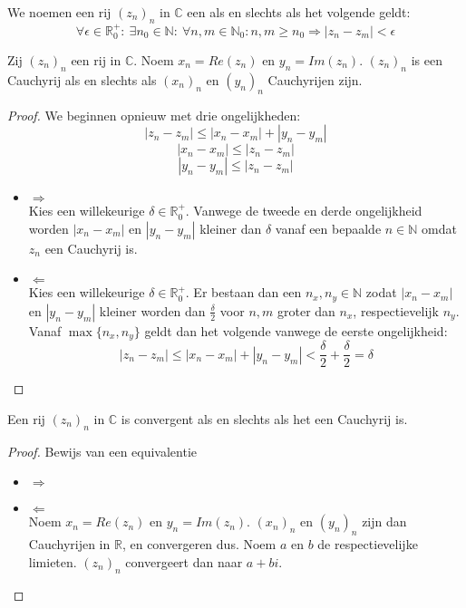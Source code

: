 \documentclass[main.tex]{subfiles}
\begin{document}
\begin{de}
  We noemen een rij $(z_{n})_{n}$ in $\mathbb{C}$ een  als en slechts als het volgende geldt:
  \[ \forall \epsilon \in \mathbb{R}_{0}^{+}:\ \exists n_{0}\in \mathbb{N}:\ \forall n,m\in \mathbb{N}_{0}: n,m\ge n_{0} \Rightarrow |z_{n}-z_{m}| < \epsilon \]
\end{de}

\begin{pr}
  Zij $(z_{n})_{n}$ een rij in $\mathbb{C}$.
  Noem $x_{n} = Re(z_{n})$ en $y_{n} = Im(z_{n})$.
  $(z_{n})_{n}$ is een Cauchyrij als en slechts als $(x_{n})_{n}$ en $(y_{n})_{n}$ Cauchyrijen zijn.

  \begin{proof}
    We beginnen opnieuw met drie ongelijkheden:
    \[ |z_{n}-z_{m}| \le |x_{n}-x_{m}| + |y_{n}-y_{m}| \]
    \[ |x_{n}-x_{m}| \le |z_{n}-z_{m}| \]
    \[ |y_{n}-y_{m}| \le |z_{n}-z_{m}| \]
    \begin{itemize}
    \item $\Rightarrow$\\
      Kies een willekeurige $\delta \in \mathbb{R}_{0}^{+}$.
      Vanwege de tweede en derde ongelijkheid worden $|x_{n}-x_{m}|$ en $|y_{n}-y_{m}|$ kleiner dan $\delta$ vanaf een bepaalde $n\in \mathbb{N}$ omdat $z_{n}$ een Cauchyrij is.
    \item $\Leftarrow$\\
      Kies een willekeurige $\delta \in \mathbb{R}_{0}^{+}$.
      Er bestaan dan een $n_{x},n_{y}\in \mathbb{N}$ zodat $|x_{n}-x_{m}|$ en $|y_{n}-y_{m}|$ kleiner worden dan $\frac{\delta}{2}$ voor $n,m$ groter dan $n_{x}$, respectievelijk $n_{y}$.
      Vanaf $\max\{n_{x},n_{y}\}$ geldt dan het volgende vanwege de eerste ongelijkheid:
      \[ |z_{n}-z_{m}| \le |x_{n}-x_{m}| + |y_{n}-y_{m}| < \frac{\delta}{2}+\frac{\delta}{2} = \delta \]
    \end{itemize}
  \end{proof}
\end{pr}

\begin{st}
  Een rij $(z_{n})_{n}$ in $\mathbb{C}$ is convergent als en slechts als het een Cauchyrij is.

  \begin{proof}
    Bewijs van een equivalentie\\
    \begin{itemize}
    \item $\Rightarrow$\\
    \item $\Leftarrow$\\
      Noem $x_{n} = Re(z_{n})$ en $y_{n} = Im(z_{n})$.
      $(x_{n})_{n}$ en $(y_{n})_{n}$ zijn dan Cauchyrijen in $\mathbb{R}$, en convergeren dus.
      Noem $a$ en $b$ de respectievelijke limieten.
      $(z_{n})_{n}$ convergeert dan naar $a+bi$.
    \end{itemize}
  \end{proof}
\end{st}
\end{document}
